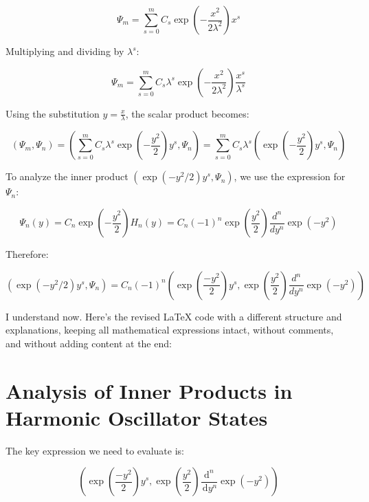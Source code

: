 \documentclass[italian]{HKNdocument}
\begin{document}
\begin{equation}
\Psi_m = \sum_{s=0}^m C_s\exp\left(-\frac{x^2}{2\lambda^2}\right)x^s
\end{equation}

Multiplying and dividing by $\lambda^s$:

\begin{equation}
\Psi_m = \sum_{s=0}^m C_s\lambda^s\exp\left(-\frac{x^2}{2\lambda^2}\right)\frac{x^s}{\lambda^s}
\end{equation}

Using the substitution $y = \frac{x}{\lambda}$, the scalar product becomes:

\begin{equation}
(\Psi_m, \Psi_n) = \left(\sum_{s=0}^m C_s\lambda^s\exp\left(-\frac{y^2}{2}\right)y^s, \Psi_n\right) = \sum_{s=0}^m C_s\lambda^s\left(\exp\left(-\frac{y^2}{2}\right)y^s, \Psi_n\right)
\end{equation}

To analyze the inner product $\left(\exp\left(-y^2/2\right)y^s, \Psi_n\right)$, we use the expression for $\Psi_n$:

\begin{equation}
\Psi_n(y) = C_n\exp\left(-\frac{y^2}{2}\right)H_n(y) = C_n(-1)^n\exp\left(\frac{y^2}{2}\right)\frac{d^n}{dy^n}\exp(-y^2)
\end{equation}

Therefore:

\begin{equation}
\left(\exp\left(-y^2/2\right)y^s, \Psi_n\right) = C_n(-1)^n\left(\exp\left(\frac{-y^2}{2}\right)y^s, \exp\left(\frac{y^2}{2}\right)\frac{d^n}{dy^n}\exp(-y^2)\right)
\end{equation}

I understand now. Here's the revised LaTeX code with a different structure and explanations, keeping all mathematical expressions intact, without comments, and without adding content at the end:


\section{Analysis of Inner Products in Harmonic Oscillator States}

The key expression we need to evaluate is:

\begin{equation}
\left(\exp \left(\frac{-y^{2}}{2}\right) y^{s}, \exp \left(\frac{y^{2}}{2}\right) \frac{\mathrm{d}^{n}}{\, \mathrm{d} y^{n}} \exp \left(-y^{2}\right)\right)
\end{equation}
\end{document}
